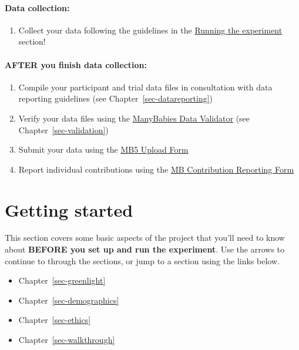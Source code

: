 \documentclass[
  letterpaper,
  DIV=11,
  numbers=noendperiod,
  oneside]{scrreprt}
\providecommand{\tightlist}{%
  \setlength{\itemsep}{0pt}\setlength{\parskip}{0pt}}
\begin{document}
\subsection{Data collection:}\label{data-collection}

\begin{enumerate}
\def\labelenumi{(\arabic{enumi})}
\setcounter{enumi}{10}
\tightlist
\item
  Collect your data following the guidelines in the
  \hyperref[sec-running]{Running the experiment} section!
\end{enumerate}

\subsection{AFTER you finish data
collection:}\label{after-you-finish-data-collection}

\begin{enumerate}
\def\labelenumi{(\arabic{enumi})}
\setcounter{enumi}{11}
\tightlist
\item
  Compile your participant and trial data files in consultation with
  data reporting guidelines (see Chapter~\ref{sec-datareporting})
\item
  Verify your data files using the
  \href{https://manybabies.org/validator/}{ManyBabies Data Validator}
  (see Chapter~\ref{sec-validation})
\item
  Submit your data using the
  \href{https://airtable.com/appRoqMKzcK3NsXt4/pagPm3MXnFExsz1Ti/form}{MB5
  Upload Form}
\item
  Report individual contributions using the
  \href{https://manybabies.org/credit/}{MB Contribution Reporting Form}
\end{enumerate}

\part{Getting started}

This section covers some basic aspects of the project that you'll need
to know about \textbf{BEFORE you set up and run the experiment}. Use the
arrows to continue to through the sections, or jump to a section using
the links below.

\begin{itemize}
\tightlist
\item
  Chapter~\ref{sec-greenlight}
\item
  Chapter~\ref{sec-demographics}
\item
  Chapter~\ref{sec-ethics}
\item
  Chapter~\ref{sec-walkthrough}
\end{itemize}
\end{document}
